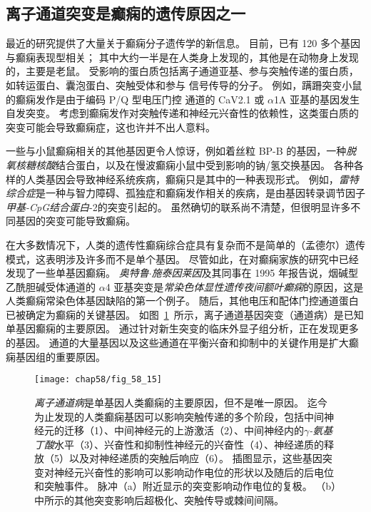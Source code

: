 \subsection{离子通道突变是癫痫的遗传原因之一}

最近的研究提供了大量关于癫痫分子遗传学的新信息。
目前，已有 120 多个基因与癫痫表现型相关；
其中大约一半是在人类身上发现的，其他是在动物身上发现的，主要是老鼠。
受影响的蛋白质包括离子通道亚基、参与突触传递的蛋白质，如转运蛋白、囊泡蛋白、突触受体和参与  信号传导的分子。
例如，蹒跚突变小鼠的癫痫发作是由于编码 P/Q 型电压门控  通道的 CaV2.1 或 $\alpha$1A 亚基的基因发生自发突变。
考虑到癫痫发作对突触传递和神经元兴奋性的依赖性，这类蛋白质的突变可能会导致癫痫症，这也许并不出人意料。


一些与小鼠癫痫相关的其他基因更令人惊讶，例如着丝粒 BP-B 的基因，一种\textit{脱氧核糖核酸}结合蛋白，以及在慢波癫痫小鼠中受到影响的钠/氢交换基因。
各种各样的人类基因会导致神经系统疾病，癫痫只是其中的一种表现形式。
例如，\textit{雷特综合症}是一种与智力障碍、孤独症和癫痫发作相关的疾病，是由基因转录调节因子\textit{甲基-CpG结合蛋白}-2的突变引起的。
虽然确切的联系尚不清楚，但很明显许多不同基因的突变可能导致癫痫。


在大多数情况下，人类的遗传性癫痫综合症具有复杂而不是简单的（孟德尔）遗传模式，这表明涉及许多而不是单个基因。
尽管如此，在对癫痫家族的研究中已经发现了一些单基因癫痫。
\textit{奥特鲁$\cdot$施泰因莱因}及其同事在 1995 年报告说，烟碱型乙酰胆碱受体通道的 $\alpha$4 亚基突变是\textit{常染色体显性遗传夜间额叶癫痫}的原因，这是人类癫痫常染色体基因缺陷的第一个例子。
随后，其他电压和配体门控通道蛋白已被确定为癫痫的关键基因。
如图~\ref{fig:58_15}~所示，离子通道基因突变（通道病）是已知单基因癫痫的主要原因。
通过针对新生突变的临床外显子组分析，正在发现更多的基因。
 通道的大量基因以及这些通道在平衡兴奋和抑制中的关键作用是扩大癫痫基因组的重要原因。


\begin{figure}[htbp]
	\centering
	\texttt{[image: chap58/fig\_58\_15]}
	\caption{\textit{离子通道病}是单基因人类癫痫的主要原因，但不是唯一原因。
		迄今为止发现的人类癫痫基因可以影响突触传递的多个阶段，包括中间神经元的迁移（1）、中间神经元的上游激活（2）、中间神经内的\textit{$\gamma$-氨基丁酸}水平（3）、兴奋性和抑制性神经元的兴奋性（4）、神经递质的释放（5）以及对神经递质的突触后响应（6）。
		插图显示，这些基因突变对神经元兴奋性的影响可以影响动作电位的形状以及随后的后电位和突触事件。
		脉冲（a）附近显示的突变影响动作电位的复极。
		（b）中所示的其他突变影响后超极化、突触传导或棘间间隔。}
	\label{fig:58_15}
\end{figure}


